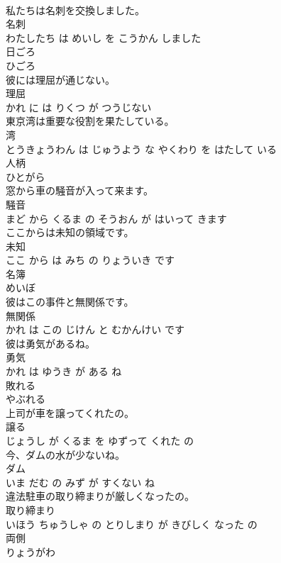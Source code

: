 \documentclass[8pt]{extreport}
\begin{document}
\begin{CJK}{UTF8}{min}
\\	私たちは名刺を交換しました。	
\\	名刺 
\\	わたしたち は めいし を こうかん しました			
\\	日ごろ	
\\	ひごろ			
\\	彼には理屈が通じない。	
\\	理屈 
\\	かれ に は りくつ が つうじない			
\\	東京湾は重要な役割を果たしている。	
\\	湾 
\\	とうきょうわん は じゅうよう な やくわり を はたして いる			
\\	人柄	
\\	ひとがら			
\\	窓から車の騒音が入って来ます。	
\\	騒音 
\\	まど から くるま の そうおん が はいって きます			
\\	ここからは未知の領域です。	
\\	未知 
\\	ここ から は みち の りょういき です			
\\	名簿	
\\	めいぼ			
\\	彼はこの事件と無関係です。	
\\	無関係 
\\	かれ は この じけん と むかんけい です			
\\	彼は勇気があるね。	
\\	勇気 
\\	かれ は ゆうき が ある ね			
\\	敗れる	
\\	やぶれる			
\\	上司が車を譲ってくれたの。	
\\	譲る 
\\	じょうし が くるま を ゆずって くれた の			
\\	今、ダムの水が少ないね。	
\\	ダム 
\\	いま だむ の みず が すくない ね			
\\	違法駐車の取り締まりが厳しくなったの。	
\\	取り締まり 
\\	いほう ちゅうしゃ の とりしまり が きびしく なった の			
\\	両側	
\\	りょうがわ			

\end{CJK}
\end{document}
